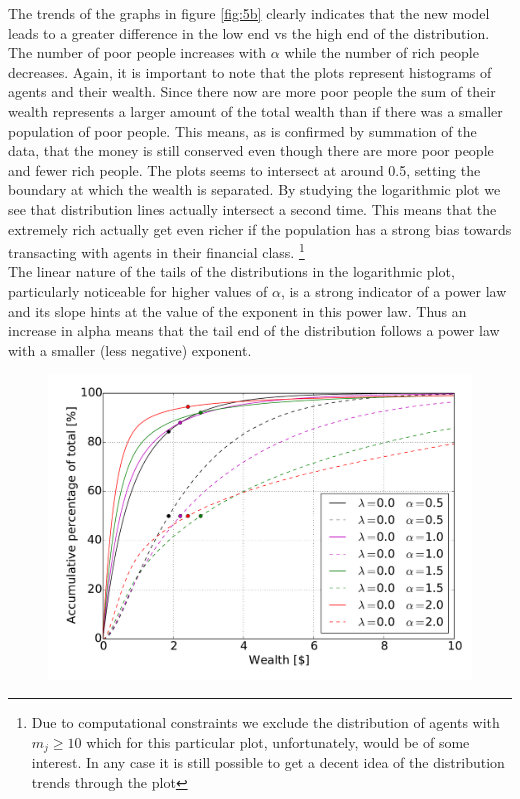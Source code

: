 The trends of the graphs in figure \ref{fig:5b} clearly indicates that the new model leads to a greater difference in the low end vs the high end of the distribution. The number of poor people increases with $\alpha$ while the number of rich people decreases. Again, it is important to note that the plots represent histograms of agents and their wealth. Since there now are more poor people the sum of their wealth represents a larger amount of the total wealth than if there was a smaller population of poor people. This means, as is confirmed by summation of the data, that the money is still conserved even though there are more poor people and fewer rich people. The plots seems to intersect at around 0.5, setting the boundary at which the wealth is separated.
By studying the logarithmic plot we see that distribution lines actually intersect a second time. This means that the extremely rich actually get even richer if the population has a strong bias towards transacting with agents in their financial class. \footnote{Due to computational constraints we exclude the distribution of agents with $m_j\geq10$ which for this particular plot, unfortunately, would be of some interest. In any case it is still possible to get a decent idea of the distribution trends through the plot} \\
The linear nature of the tails of the distributions in the logarithmic plot, particularly noticeable for higher values of $\alpha$, is a strong indicator of a power law and its slope hints at the value of the exponent in this power law. Thus an increase in alpha means that the tail end of the distribution follows a power law with a smaller (less negative) exponent.\\
\begin{figure}[H]
    \centering
    \includegraphics[width = 0.7\linewidth]{result/5d-accu-persons-accu-money}
    \caption{}
    \label{fig:accu2}
\end{figure}
